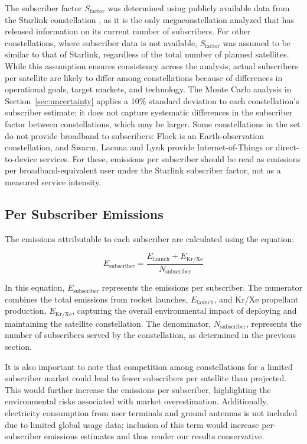 \documentclass[pdflatex,sn-mathphys-num]{sn-jnl}
\theoremstyle{thmstyleone}%
\theoremstyle{thmstyletwo}%
\theoremstyle{thmstylethree}%
\begin{document}
The subscriber factor \( S_{\text{factor}} \) was determined using publicly available data from the Starlink constellation \citep{ma_network_2023}, as it is the only megaconstellation analyzed that has released information on its current number of subscribers. For other constellations, where subscriber data is not available, \( S_{\text{factor}} \) was assumed to be similar to that of Starlink, regardless of the total number of planned satellites. While this assumption ensures consistency across the analysis, actual subscribers per satellite are likely to differ among constellations because of differences in operational goals, target markets, and technology. The Monte Carlo analysis in Section~\ref{sec:uncertainty} applies a 10\% standard deviation to each constellation's subscriber estimate; it does not capture systematic differences in the subscriber factor between constellations, which may be larger. Some constellations in the set do not provide broadband to subscribers: Flock is an Earth-observation constellation, and Swarm, Lacuna and Lynk provide Internet-of-Things or direct-to-device services. For these, emissions per subscriber should be read as emissions per broadband-equivalent user under the Starlink subscriber factor, not as a measured service intensity.

\subsection{Per Subscriber Emissions}

The emissions attributable to each subscriber are calculated using the equation:

\begin{equation}
E_{\text{subscriber}} = \frac{E_{\text{launch}} + E_{\text{Kr/Xe}}}{N_{\text{subscriber}}}
\end{equation}

In this equation, \( E_{\text{subscriber}} \) represents the emissions per subscriber. The numerator combines the total emissions from rocket launches, \( E_{\text{launch}} \), and Kr/Xe propellant production, \( E_{\text{Kr/Xe}} \), capturing the overall environmental impact of deploying and maintaining the satellite constellation. The denominator, \( N_{\text{subscriber}} \), represents the number of subscribers served by the constellation, as determined in the previous section.

It is also important to note that competition among constellations for a limited subscriber market could lead to fewer subscribers per satellite than projected. This would further increase the emissions per subscriber, highlighting the environmental risks associated with market overestimation. Additionally, electricity consumption from user terminals and ground antennas is not included due to limited global usage data; inclusion of this term would increase per-subscriber emissions estimates and thus render our results conservative.
\end{document}
